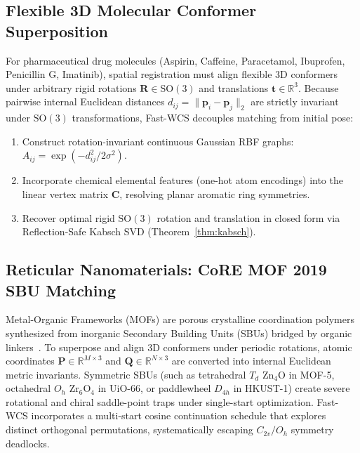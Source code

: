 \documentclass[a4paper,fleqn]{cas-dc}
\theoremstyle{thmstyleone}
\theoremstyle{thmstyletwo}
\theoremstyle{thmstylethree}
\begin{document}
\subsection{Flexible 3D Molecular Conformer Superposition}
For pharmaceutical drug molecules (Aspirin, Caffeine, Paracetamol, Ibuprofen, Penicillin G, Imatinib), spatial registration must align flexible 3D conformers under arbitrary rigid rotations $\mathbf{R} \in \mathrm{SO}(3)$ and translations $\mathbf{t} \in \mathbb{R}^3$. Because pairwise internal Euclidean distances $d_{ij} = \|\mathbf{p}_i - \mathbf{p}_j\|_2$ are strictly invariant under $\mathrm{SO}(3)$ transformations, Fast-WCS decouples matching from initial pose:
\begin{enumerate}
    \item Construct rotation-invariant continuous Gaussian RBF graphs: $A_{ij} = \exp(-d_{ij}^2 / 2\sigma^2)$.
    \item Incorporate chemical elemental features (one-hot atom encodings) into the linear vertex matrix $\mathbf{C}$, resolving planar aromatic ring symmetries.
    \item Recover optimal rigid $\mathrm{SO}(3)$ rotation and translation in closed form via Reflection-Safe Kabsch SVD (Theorem~\ref{thm:kabsch}).
\end{enumerate}

\subsection{Reticular Nanomaterials: CoRE MOF 2019 SBU Matching}
Metal-Organic Frameworks (MOFs) are porous crystalline coordination polymers synthesized from inorganic Secondary Building Units (SBUs) bridged by organic linkers~\cite{chung2019}. To superpose and align 3D conformers under periodic rotations, atomic coordinates $\mathbf{P} \in \mathbb{R}^{M \times 3}$ and $\mathbf{Q} \in \mathbb{R}^{N \times 3}$ are converted into internal Euclidean metric invariants. Symmetric SBUs (such as tetrahedral $T_d$ $\mathrm{Zn}_4\mathrm{O}$ in MOF-5, octahedral $O_h$ $\mathrm{Zr}_6\mathrm{O}_4$ in UiO-66, or paddlewheel $D_{4h}$ in HKUST-1) create severe rotational and chiral saddle-point traps under single-start optimization. Fast-WCS incorporates a multi-start cosine continuation schedule that explores distinct orthogonal permutations, systematically escaping $C_{2v}/O_h$ symmetry deadlocks.
\end{document}
